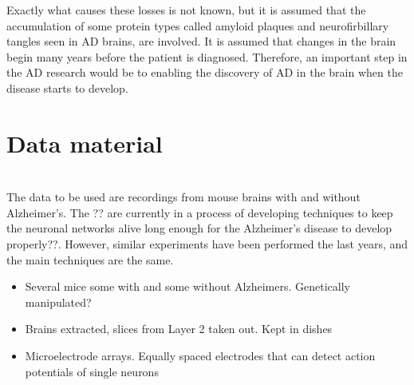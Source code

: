 Exactly what causes these losses is not known, but it is assumed that the accumulation of some protein types called amyloid plaques and neurofirbillary tangles seen in AD brains, are involved.
It is assumed that changes in the brain begin many years before the patient is diagnosed. Therefore, an important step in the AD research would be to enabling the discovery of AD in the brain when the disease starts to develop.


\section{Data material}

\label{Lab}\\
The data to be used are recordings from mouse brains with and without Alzheimer's. The ?? are currently in a process of developing techniques to keep the neuronal networks alive long enough for the Alzheimer's disease to develop properly??. However, similar experiments have been performed the last years, and the main techniques are the same. 
\begin{itemize}
    \item Several mice some with and some without Alzheimers. Genetically manipulated? 
    \item Brains extracted, slices from Layer 2 taken out. Kept in dishes
    \item Microelectrode arrays. Equally spaced electrodes that can detect action potentials of single neurons
    
\end{itemize}

